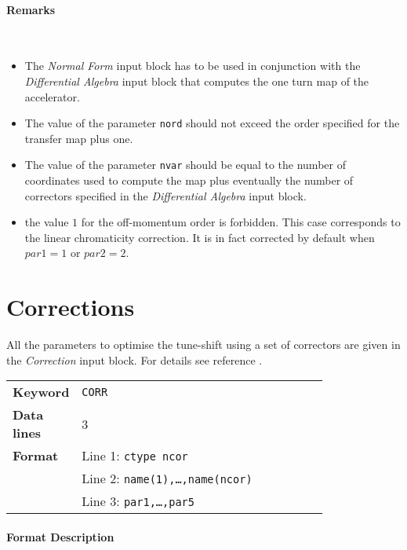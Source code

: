 \paragraph{Remarks}~
\begin{itemize}
    \item The \textit{Normal Form} input block has to be used in conjunction with the \textit{Differential Algebra} input block that computes the one turn map of the accelerator.
    \item The value of the parameter \texttt{nord} should not exceed the order specified for the transfer map plus one.
    \item The value of the parameter \texttt{nvar} should be equal to the number of coordinates used to compute the map plus eventually the number of correctors specified in the \textit{Differential Algebra} input block.
    \item the value $1$ for the off-momentum order is forbidden. This case corresponds to the linear chromaticity correction. It is in fact corrected by default when $par1 =1$ or $par2 =2$.
\end{itemize}

\section{Corrections} \label{Corrections}

All the parameters to optimise the tune-shift using a set of correctors are given in the \textit{Correction} input block.
For details see reference \cite{Massimo}.

\bigskip
\begin{tabular}{@{}lp{0.8\linewidth}}
    \textbf{Keyword}    & \texttt{CORR} \\
    \textbf{Data lines} & 3 \\
    \textbf{Format}     & Line 1: \texttt{ctype ncor} \\
                        & Line 2: \texttt{name(1),\ldots,name(ncor)} \\
                        & Line 3: \texttt{par1,\ldots,par5}
\end{tabular}

\paragraph{Format Description}~

